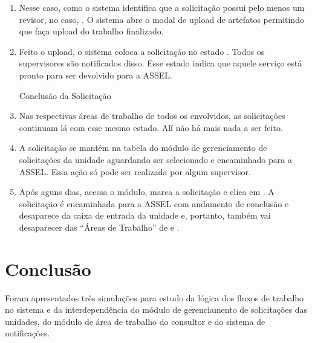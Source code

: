 \begin{landscape}
\begin{enumerate}
	\item Nesse caso, como o sistema identifica que a solicitação \SOLU possui pelo menos um revisor, no caso, \RU. O sistema abre o modal de upload de artefatos permitindo que \ED faça upload do trabalho finalizado. 
	
	\item Feito o upload, o sistema coloca a solicitação no estado . Todos os supervisores são notificados disso. Esse estado indica que aquele serviço está pronto para ser devolvido para a ASSEL.

	{}{\ED}{\RU}{Conclusão da Solicitação}
	
	\item Nas respectivas áreas de trabalho de todos os envolvidos, as solicitações continuam lá com esse mesmo estado. Alí não há mais nada a ser feito. 

	{}{\ED}{\RU}{\ED}

	{}{\ED}{\RU}{\RU}

	
	\item A solicitação se mantém na tabela do módulo de gerenciamento de solicitações da unidade aguardando ser selecionado e encaminhado para a ASSEL. Essa ação só pode ser realizada por algum supervisor.
	
	\item Após aguns dias, \SD acessa o módulo, marca a solicitação e clica em \bEncaminhar. A solicitação é encaminhada para a ASSEL com andamento de conclusão e desaparece da caixa de entrada da unidade e, portanto, também vai desaparecer das ``Áreas de Trabalho'' de \ED e \RU.
\end{enumerate}

\end{landscape}

\pagebreak

\section{Conclusão}

Foram apresentados três simulações para estudo da lógica dos fluxos de trabalho no sistema e da interdependência do módulo de gerenciamento de solicitações das unidades, do módulo de área de trabalho do consultor e do sistema de notificações.


